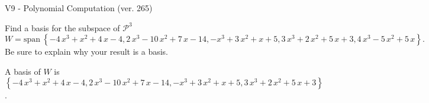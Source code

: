 \begin{exercise}
  \begin{exerciseTitle}V9 - Polynomial Computation (ver. 265)\end{exerciseTitle}
  \begin{exerciseStatement}
    Find a basis for the subspace of \(\mathcal{P}^3\) 
\[W=\mathrm{span}\ \left\{-4 \, x^{3} + x^{2} + 4 \, x - 4 , 2 \, x^{3} - 10 \, x^{2} + 7 \, x - 14 , -x^{3} + 3 \, x^{2} + x + 5 , 3 \, x^{3} + 2 \, x^{2} + 5 \, x + 3 , 4 \, x^{3} - 5 \, x^{2} + 5 \, x\right\}.\]
 Be sure to explain why your result is a basis.


  \end{exerciseStatement}
  \begin{exerciseAnswer}
   A basis of \(W\) is  \(\left\{-4 \, x^{3} + x^{2} + 4 \, x - 4 , 2 \, x^{3} - 10 \, x^{2} + 7 \, x - 14 , -x^{3} + 3 \, x^{2} + x + 5 , 3 \, x^{3} + 2 \, x^{2} + 5 \, x + 3\right\}\).
  


  \end{exerciseAnswer}
\end{exercise}